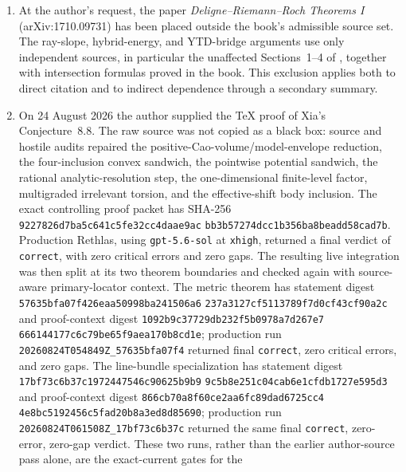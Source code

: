 \begin{enumerate}
  extension, residual Monge--Amp\`ere continuity, and canonical degeneration
  limits; and the YTD bridge uses the resulting internal formulas with the
  factor-two normalization and the stated Fano automorphism hypotheses.
  These are source reconstructions, not new Rethlas claims.
\item At the author's request, the paper \emph{Deligne--Riemann--Roch
  Theorems I} (arXiv:1710.09731) has been placed outside the book's
  admissible source set.  The ray-slope,
  hybrid-energy, and YTD-bridge arguments use only independent sources,
  in particular the unaffected Sections~1--4 of \cite{BHJ19}, together
  with intersection formulas proved in the book.  This exclusion applies
  both to direct citation and to indirect dependence through a secondary
  summary.
\item On 24 August 2026 the author supplied the TeX proof of Xia's
  Conjecture~8.8.  The raw source was not copied as a black box: source and
  hostile audits repaired the positive-Cao-volume/model-envelope reduction,
  the four-inclusion convex sandwich, the pointwise potential sandwich, the
  rational analytic-resolution step, the one-dimensional finite-level
  factor, multigraded irrelevant torsion, and the effective-shift body
  inclusion.  The exact controlling proof packet has SHA-256
  \texttt{9227826d7ba5c641c5fe32cc4daae9ac}
  \allowbreak\texttt{bb3b57274dcc1b356ba8beadd58cad7b}.  Production Rethlas,
  using \texttt{gpt-5.6-sol} at \texttt{xhigh}, returned a final verdict of
  \texttt{correct}, with zero critical errors and zero gaps.  The resulting
  live integration was then split at its two theorem boundaries and checked
  again with source-aware primary-locator context.  The metric theorem has
  statement digest
  \texttt{57635bfa07f426eaa50998ba241506a6}\allowbreak
  \texttt{237a3127cf5113789f7d0cf43cf90a2c} and proof-context digest
  \texttt{1092b9c37729db232f5b0978a7d267e7}\allowbreak
  \texttt{666144177c6c79be65f9aea170b8cd1e}; production run
  \texttt{20260824T054849Z\_57635bfa07f4} returned final
  \texttt{correct}, zero critical errors, and zero gaps.  The line-bundle
  specialization has statement digest
  \texttt{17bf73c6b37c1972447546c90625b9b9}\allowbreak
  \texttt{9c5b8e251c04cab6e1cfdb1727e595d3} and proof-context digest
  \texttt{866cb70a8f60ce2aa6fc89dad6725cc4}\allowbreak
  \texttt{4e8bc5192456c5fad20b8a3ed8d85690}; production run
  \texttt{20260824T061508Z\_17bf73c6b37c} returned the same final
  \texttt{correct}, zero-error, zero-gap verdict.  These two runs, rather than
  the earlier author-source pass alone, are the exact-current gates for the

\end{enumerate}
